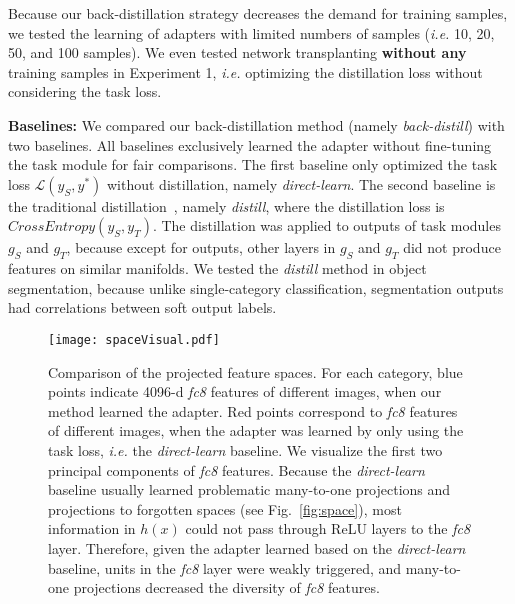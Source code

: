 \documentclass[10pt,twocolumn,letterpaper]{article}
\begin{document}
Because our back-distillation strategy decreases the demand for training samples, we tested the learning of adapters with limited numbers of samples (\emph{i.e.} 10, 20, 50, and 100 samples). We even tested network transplanting \textbf{without any} training samples in Experiment 1, \emph{i.e.} optimizing the distillation loss without considering the task loss.



\textbf{Baselines:} We compared our back-distillation method (namely \textit{back-distill}) with two baselines. All baselines exclusively learned the adapter without fine-tuning the task module for fair comparisons. The first baseline only optimized the task loss {\small$\mathcal{L}(y_{S},y^{*})$} without distillation, namely \textit{direct-learn}. The second baseline is the traditional distillation~\cite{distill}, namely \textit{distill}, where the distillation loss is {\small$CrossEntropy(y_{S},y_{T})$}. The distillation was applied to outputs of task modules {\small$g_{S}$} and {\small$g_{T}$}, because except for outputs, other layers in {\small$g_{S}$} and {\small$g_{T}$} did not produce features on similar manifolds. We tested the \textit{distill} method in object segmentation, because unlike single-category classification, segmentation outputs had correlations between soft output labels.

\begin{figure*}[t]
\centering
\texttt{[image: spaceVisual.pdf]}
\vspace{2pt}
\caption{Comparison of the projected feature spaces. For each category, blue points indicate 4096-d \textit{fc8} features of different images, when our method learned the adapter. Red points correspond to \textit{fc8} features of different images, when the adapter was learned by only using the task loss, \emph{i.e.} the \textit{direct-learn} baseline. We visualize the first two principal components of \textit{fc8} features. Because the \textit{direct-learn} baseline usually learned problematic many-to-one projections and projections to forgotten spaces (see Fig.~\ref{fig:space}), most information in $h(x)$ could not pass through ReLU layers to the \textit{fc8} layer. Therefore, given the adapter learned based on the \textit{direct-learn} baseline, units in the \textit{fc8} layer were weakly triggered, and many-to-one projections decreased the diversity of \textit{fc8} features.}
\label{fig:spaceVisual}
\end{figure*}
\end{document}
